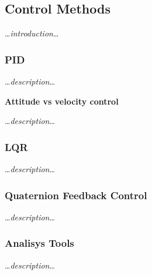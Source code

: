 \subsection{Control Methods}
    \dots\textit{introduction}\dots
    
    \subsubsection{PID}
        \dots\textit{description}\dots
        
        \textbf{Attitude vs velocity control}

            \dots\textit{description}\dots
    
    \subsubsection{LQR}\label{sec:lqr}
        \dots\textit{description}\dots

    \subsubsection{Quaternion Feedback Control}
        \dots\textit{description}\dots
    
    \subsubsection{Analisys Tools}
        \dots\textit{description}\dots